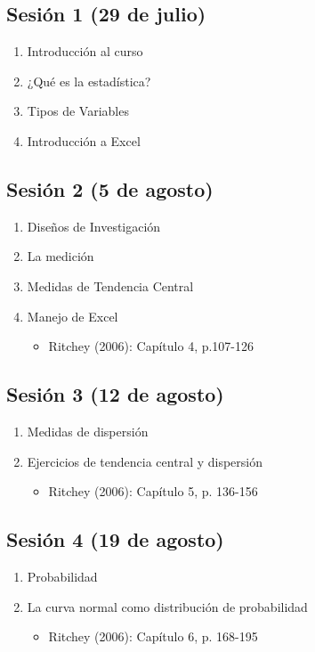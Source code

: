 \documentclass[letterpaper]{article}
\begin{document}
\subsection{Sesión 1 (29 de julio)}
\begin{enumerate}
	\item Introducción al curso
	\item ¿Qué es la estadística?
	\item Tipos de Variables
	\item Introducción a Excel
\end{enumerate}

\subsection{Sesión 2 (5 de agosto)}
\begin{enumerate}
\item Diseños de Investigación
\item La medición
\item Medidas de Tendencia Central
\item Manejo de Excel
\begin{itemize}
	\item Ritchey (2006): Capítulo 4, p.107-126
\end{itemize}
\end{enumerate}

\subsection{Sesión 3 (12 de agosto)}
\begin{enumerate}
\item Medidas de dispersión
\item Ejercicios de tendencia central y dispersión
\begin{itemize}
\item Ritchey (2006):
Capítulo 5, p.
136-156
\end{itemize}
\end{enumerate}

\subsection{Sesión 4 (19 de agosto)}
\begin{enumerate}
\item Probabilidad 
\item La curva normal como distribución de probabilidad
\begin{itemize}
\item Ritchey (2006):
Capítulo 6, p.
168-195
\end{itemize}
\end{enumerate}
\end{document}
